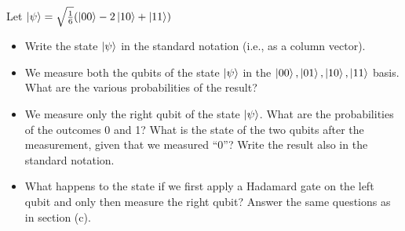 Let $\ket{\psi} = \sqrt{\frac{1}{6}}(\ket{00}-2\ket{10}+\ket{11})$
\begin{itemize}
    \item[a)] Write the state $\ket{\psi}$ in the standard notation (i.e., as a column vector).
    \item[b)] We measure both the qubits of the state $\ket{\psi}$ in the ${\ket{00},\ket{01},\ket{10},\ket{11}}$ basis.
    What are the various probabilities of the result?
    \item[c)] We measure only the right qubit of the state $\ket{\psi}$.
    What are the probabilities of the outcomes 0 and 1?
    What is the state of the two qubits after the measurement, given that we measured “0”?
    Write the result also in the standard notation.
    \item[d)] What happens to the state if we first apply a Hadamard gate on the left qubit and
    only then measure the right qubit?
    Answer the same questions as in section (c).
\end{itemize}
